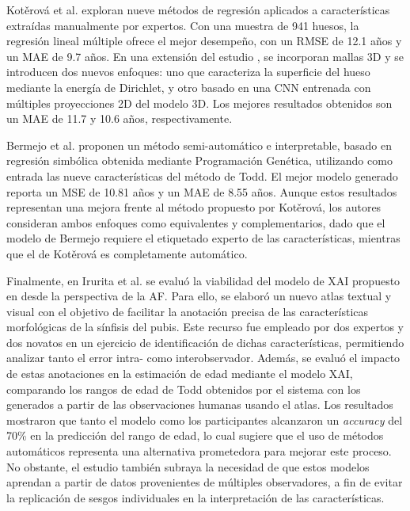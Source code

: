 Kotěrová et al. \cite{kotverova2018age} exploran nueve métodos de regresión aplicados a características extraídas manualmente por expertos. Con una muestra de 941 huesos, la regresión lineal múltiple ofrece el mejor desempeño, con un RMSE de 12.1 años y un MAE de 9.7 años. En una extensión del estudio \cite{koterova_computational_2022}, se incorporan mallas 3D y se introducen dos nuevos enfoques: uno que caracteriza la superficie del hueso mediante la energía de Dirichlet, y otro basado en una CNN entrenada con múltiples proyecciones 2D del modelo 3D. Los mejores resultados obtenidos son un MAE de 11.7 y 10.6 años, respectivamente.

Bermejo et al. \cite{bermejo_interpretable_2025} proponen un método semi-automático e interpretable, basado en regresión simbólica obtenida mediante Programación Genética, utilizando como entrada las nueve características del método de Todd. El mejor modelo generado reporta un MSE de 10.81 años y un MAE de 8.55 años. Aunque estos resultados representan una mejora frente al método propuesto por Kotěrová, los autores consideran ambos enfoques como equivalentes y complementarios, dado que el modelo de Bermejo requiere el etiquetado experto de las características, mientras que el de Kotěrová es completamente automático.

Finalmente, en Irurita et al. \cite{irurita2025pubic} se evaluó la viabilidad del modelo de XAI propuesto en \cite{granados} desde la perspectiva de la AF. Para ello, se elaboró un nuevo atlas textual y visual con el objetivo de facilitar la anotación precisa de las características morfológicas de la sínfisis del pubis. Este recurso fue empleado por dos expertos y dos novatos en un ejercicio de identificación de dichas características, permitiendo analizar tanto el error intra- como interobservador. Además, se evaluó el impacto de estas anotaciones en la estimación de edad mediante el modelo XAI, comparando los rangos de edad de Todd obtenidos por el sistema con los generados a partir de las observaciones humanas usando el atlas. Los resultados mostraron que tanto el modelo como los participantes alcanzaron un \textit{accuracy} del 70\% en la predicción del rango de edad, lo cual sugiere que el uso de métodos automáticos representa una alternativa prometedora para mejorar este proceso. No obstante, el estudio también subraya la necesidad de que estos modelos aprendan a partir de datos provenientes de múltiples observadores, a fin de evitar la replicación de sesgos individuales en la interpretación de las características.

